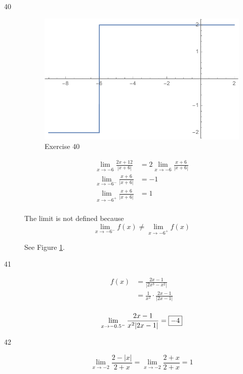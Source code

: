 \documentclass[letterpaper, landscape]{exam}
\begin{document}
\begin{description}
      \item[40]
        \begin{figure}[H]
          \centering
          \includegraphics[scale = 0.5]{ex40.pdf}
          \caption{Exercise 40}
          \label{fig:ex40}
        \end{figure}

        \begin{align*}
          \lim_{x \to -6} \frac{2x + 12}{|x + 6|} & = 2 \lim_{x \to -6} \frac{x + 6}{|x + 6|}
          \\
          \lim_{x \to -6^-} \frac{x + 6}{|x + 6|} & = -1 \\
          \lim_{x \to -6^+} \frac{x + 6}{|x + 6|} & = 1 \\
        \end{align*}

        The limit is not defined because 
        \[
          \lim_{x \to -6^-} f(x) \neq \lim_{x \to -6^+} f(x)
        \]

        See Figure \ref{fig:ex40}.

      \newpage

      \item[41]
        \begin{align*}
          f(x) & = \frac{2x - 1}{|2x^3 - x^2|} \\
               & = \frac{1}{x^2} \cdot \frac{2x - 1}{|2x - 1|} \\
        \end{align*}

        \[
          \lim_{x \to -0.5^-} \frac{2x - 1}{x^2 |2x - 1|} = \boxed{ -4 } \\
        \]
        
      \item[42] 
        \[
          \lim_{x \to -2} \frac{2 - |x|}{2 + x} = \lim_{x \to -2} \frac{2 + x}{2 + x} = \boxed{ 1 }
        \]


\end{description}
\end{document}
